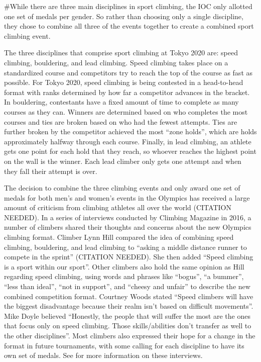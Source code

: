 \documentclass[12pt]{article}
\begin{document}
\#While there are three main disciplines in sport climbing, the IOC only
allotted one set of medals per gender. So rather than choosing only a
single discipline, they chose to combine all three of the events
together to create a combined sport climbing event.

The three disciplines that comprise sport climbing at Tokyo 2020 are:
speed climbing, bouldering, and lead climbing. Speed climbing takes
place on a standardized course and competitors try to reach the top of
the course as fast as possible. For Tokyo 2020, speed climbing is being
contested in a head-to-head format with ranks determined by how far a
competitor advances in the bracket. In bouldering, contestants have a
fixed amount of time to complete as many courses as they can. Winners
are determined based on who completes the most courses and ties are
broken based on who had the fewest attempts. Ties are further broken by
the competitor achieved the most ``zone holds'', which are holds
approximately halfway through each course. Finally, in lead climbing, an
athlete gets one point for each hold that they reach, so whoever reaches
the highest point on the wall is the winner. Each lead climber only gets
one attempt and when they fall their attempt is over.

The decision to combine the three climbing events and only award one set
of medals for both men's and women's events in the Olympics has received
a large amount of criticism from climbing athletes all over the world
(CITATION NEEDED). In a series of interviews conducted by Climbing
Magazine in 2016, a number of climbers shared their thoughts and
concerns about the new Olympics climbing format. Climber Lynn Hill
compared the idea of combining speed climbing, bouldering, and lead
climbing to ``asking a middle distance runner to compete in the sprint''
(CITATION NEEDED). She then added ``Speed climbing is a sport within our
sport''. Other climbers also hold the same opinion as Hill regarding
speed climbing, using words and phrases like ``bogus'', ``a bummer'',
``less than ideal'', ``not in support'', and ``cheesy and unfair'' to
describe the new combined competition format. Courtney Woods stated
``Speed climbers will have the biggest disadvantage because their realm
isn't based on difficult movements''. Mike Doyle believed ``Honestly,
the people that will suffer the most are the ones that focus only on
speed climbing. Those skills/abilities don't transfer as well to the
other disciplines''. Most climbers also expressed their hope for a
change in the format in future tournaments, with some calling for each
discipline to have its own set of medals. See \citet{blanchard2016} for
more information on these interviews.
\end{document}
